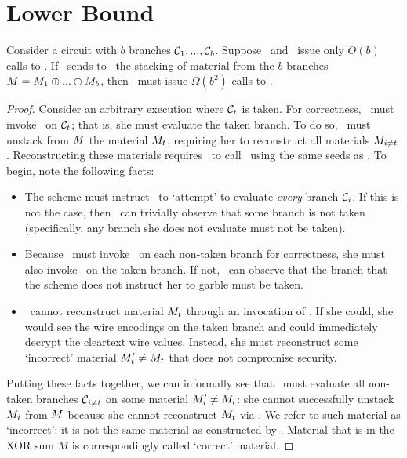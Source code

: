 \section{Lower Bound}\label{sec:lowerbound}
\begin{theorem}
Consider a circuit with $b$ branches $\mathcal C_1,..., \mathcal C_b$.  Suppose \Eval\ and \Gen\ issue only
$O(b)$ calls to \Gb. If \Gen\ sends to \Eval\ the stacking of material from
the $b$ branches $M = M_1 \oplus ... \oplus M_b$, then \Gen\ must issue $\Omega(b^2)$  calls to \Ev.
\end{theorem}
\begin{proof}
Consider an arbitrary execution where $\mathcal C_t$  is taken.
For correctness, \Eval\ must invoke \Ev\ on $\mathcal C_t$; that is, she
must evaluate the taken branch.
To do so, \Eval\ must unstack from $M$ the material $M_t$,
requiring her to reconstruct all materials $M_{i\neq t}$.
Reconstructing these materials requires \Eval\ to call \Gb\ using the
same seeds as \Gen.
%
To begin, note the following facts:
\begin{itemize}
  \item
    The scheme must instruct \Eval\ to `attempt' to
    evaluate \emph{every} branch $\mathcal C_i$. If this is not the case,
    then \Eval\ can trivially observe that some branch is not taken
    (specifically, any branch she does not evaluate must not be
    taken).
  \item
    Because \Eval\ must invoke \Gb\ on each non-taken branch for
    correctness, she must also invoke \Gb\ on the taken branch.
    If not, \Eval\ can observe that the branch that the
    scheme does not instruct her to garble must be taken.
  \item
    \Eval\ cannot reconstruct material $M_t$
    through an invocation of \Gb. If she could, she would
    see the wire encodings on the taken branch and could immediately
    decrypt the cleartext wire values.
    Instead, she must reconstruct some `incorrect' material $M_t'
    \neq M_t$ that does not compromise security.
\end{itemize}
Putting these facts together, we can informally see that
\Eval\ must evaluate all non-taken branches $\mathcal C_{i\neq t}$ on some
material $M_i' \neq M_i$: she cannot successfully unstack $M_i$
from $M$ because she cannot reconstruct $M_t$ via \Gb.
%
We refer to such material as `incorrect': it is not the same material
as constructed by \Gb.
Material that is in the XOR sum $M$ is correspondingly called
`correct' material.


\end{proof}
